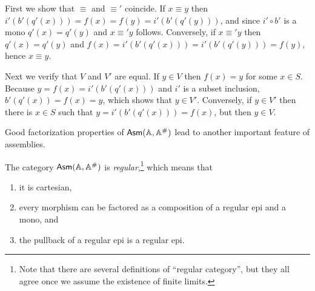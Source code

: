 First we show that $\equiv$ and $\equiv'$ coincide. If $x \equiv y$
then $i'(b'(q'(x))) = f(x) = f(y) = i'(b'(q'(y)))$, and since $i'
\circ b'$ is a mono $q'(x) = q'(y)$ and $x \equiv' y$ follows.
Conversely, if $x \equiv' y$ then $q'(x) = q'(y)$ and $f(x) =
i'(b'(q'(x))) = i'(b'(q'(y))) = f(y)$, hence $x \equiv y$.

Next we verify that $V$ and $V'$ are equal. If $y \in V$ then $f(x) =
y$ for some $x \in S$. Because $y = f(x) = i'(b'(q'(x)))$ and $i'$ is
a subset inclusion, $b'(q'(x)) = f(x) = y$, which shows that $y \in
V'$. Conversely, if $y \in V'$ then there is $x \in S$ such that $y =
i'(b'(q'(x))) = f(x)$, but then $y \in V$.

Good factorization properties of $\mathsf{Asm}(\mathbb{A},\mathbb{A}^{\#})$ lead to another important
feature of assemblies.

\begin{proposition}
  \label{prop:asm-regular}%
  The category $\mathsf{Asm}(\mathbb{A},\mathbb{A}^{\#})$ is \emph{regular},\footnote{Note that there are
    several definitions of ``regular category'', but they all agree
    once we assume the existence of finite limits.} which means that
  \begin{enumerate}
  \item it is cartesian,
  \item every morphism can be factored as a composition of a regular
    epi and a mono, and
  \item the pullback of a regular epi is a regular epi.
  \end{enumerate}
\end{proposition}


